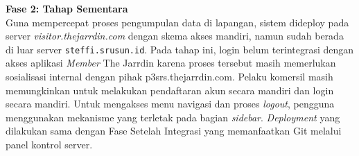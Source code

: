 \textbf{Fase 2: Tahap Sementara}\\
Guna mempercepat proses pengumpulan data di lapangan, sistem dideploy pada server {\it visitor.thejarrdin.com} dengan skema akses mandiri, namun sudah berada di luar server \texttt{steffi.srusun.id}. Pada tahap ini, login belum terintegrasi dengan akses aplikasi \textit{Member} The Jarrdin karena proses tersebut masih memerlukan sosialisasi internal dengan pihak {p3srs.thejarrdin.com}. Pelaku komersil masih memungkinkan untuk melakukan pendaftaran akun secara mandiri dan login secara mandiri. Untuk mengakses menu navigasi dan proses \textit{logout}, pengguna menggunakan mekanisme yang terletak pada bagian \textit{sidebar}. \textit{Deployment} yang dilakukan sama dengan Fase Setelah Integrasi yang memanfaatkan Git melalui panel kontrol server.


